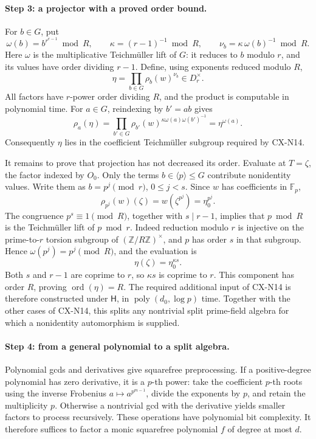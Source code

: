 \paragraph{Step 3: a projector with a proved order bound.}
For \(b\in G\), put
\[
 \omega(b)=b^{r^{e-1}}\bmod R,
 \qquad \kappa=(r-1)^{-1}\bmod R,
 \qquad \nu_b=\kappa\,\omega(b)^{-1}\bmod R.
\]
Here \(\omega\) is the multiplicative Teichm\"uller lift of
\(G\): it reduces to \(b\) modulo \(r\), and its values have
order dividing \(r-1\).
Define, using exponents reduced modulo \(R\),
\[
 \eta=\prod_{b\in G}\rho_b(w)^{\nu_b}\in D_r^\times.
\]
All factors have \(r\)-power order dividing \(R\), and the
product is computable in polynomial time.
For \(a\in G\), reindexing by \(b'=ab\) gives
\[
 \rho_a(\eta)
 =\prod_{b'\in G}\rho_{b'}(w)^{{\kappa}\omega(a)\omega(b')^{-1}}
 =\eta^{\omega(a)}.
\]
Consequently \(\eta\) lies in the coefficient Teichm\"uller
subgroup required by CX-N14.

It remains to prove that projection has not decreased its order.
Evaluate at \(T=\zeta\), the factor indexed by \(O_0\).
Only the terms \(b\in\langle p\rangle\leq G\) contribute
nonidentity values. Write them as \(b=p^j\pmod r\),
\(0\leq j<s\). Since \(w\) has coefficients in
\(\mathbb F_p\),
\[
 \rho_{p^j}(w)(\zeta)=w(\zeta^{p^j})=\eta_0^{p^j}.
\]
The congruence \(p^s\equiv1\pmod R\), together with
\(s\mid r-1\), implies that \(p\bmod R\) is the
Teichm\"uller lift of \(p\bmod r\). Indeed reduction modulo
\(r\) is injective on the prime-to-\(r\) torsion subgroup of
\((\mathbb Z/R\mathbb Z)^\times\), and \(p\) has order
\(s\) in that subgroup.
Hence \(\omega(p^j)=p^j\pmod R\), and the evaluation is
\[
 \eta(\zeta)=\eta_0^{\kappa s}.
\]
Both \(s\) and \(r-1\) are coprime to \(r\), so
\(\kappa s\) is coprime to \(r\).
This component has order \(R\), proving
\(\operatorname{ord}(\eta)=R\).
The required additional input of CX-N14 is therefore constructed
under \(\mathsf H\), in \(\operatorname{poly}(d_0,\log p)\)
time. Together with the other cases of CX-N14, this splits any
nontrivial split prime-field algebra for which a nonidentity
automorphism is supplied.

\paragraph{Step 4: from a general polynomial to a split algebra.}
Polynomial gcds and derivatives give squarefree preprocessing.
If a positive-degree polynomial has zero derivative, it is a
\(p\)-th power: take the coefficient \(p\)-th roots using the
inverse Frobenius \(a\mapsto a^{p^{m-1}}\), divide the exponents
by \(p\), and retain the multiplicity \(p\).
Otherwise a nontrivial gcd with the derivative yields smaller
factors to process recursively.
These operations have polynomial bit complexity.
It therefore suffices to factor a monic squarefree polynomial
\(f\) of degree at most \(d\).

